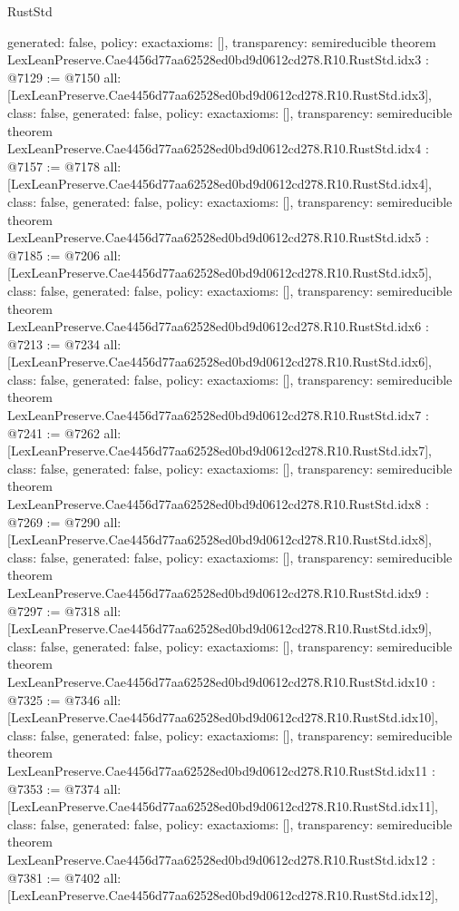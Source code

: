 \begin{lexlean}{RustStd}
\begin{coremodule}
{  generated: false,
  policy: exact{axioms: []},
  transparency: semireducible
}
theorem LexLeanPreserve.Cae4456d77aa62528ed0bd9d0612cd278.R10.RustStd.idx3 : @7129 := @7150 {
  all: [LexLeanPreserve.Cae4456d77aa62528ed0bd9d0612cd278.R10.RustStd.idx3],
  class: false,
  generated: false,
  policy: exact{axioms: []},
  transparency: semireducible
}
theorem LexLeanPreserve.Cae4456d77aa62528ed0bd9d0612cd278.R10.RustStd.idx4 : @7157 := @7178 {
  all: [LexLeanPreserve.Cae4456d77aa62528ed0bd9d0612cd278.R10.RustStd.idx4],
  class: false,
  generated: false,
  policy: exact{axioms: []},
  transparency: semireducible
}
theorem LexLeanPreserve.Cae4456d77aa62528ed0bd9d0612cd278.R10.RustStd.idx5 : @7185 := @7206 {
  all: [LexLeanPreserve.Cae4456d77aa62528ed0bd9d0612cd278.R10.RustStd.idx5],
  class: false,
  generated: false,
  policy: exact{axioms: []},
  transparency: semireducible
}
theorem LexLeanPreserve.Cae4456d77aa62528ed0bd9d0612cd278.R10.RustStd.idx6 : @7213 := @7234 {
  all: [LexLeanPreserve.Cae4456d77aa62528ed0bd9d0612cd278.R10.RustStd.idx6],
  class: false,
  generated: false,
  policy: exact{axioms: []},
  transparency: semireducible
}
theorem LexLeanPreserve.Cae4456d77aa62528ed0bd9d0612cd278.R10.RustStd.idx7 : @7241 := @7262 {
  all: [LexLeanPreserve.Cae4456d77aa62528ed0bd9d0612cd278.R10.RustStd.idx7],
  class: false,
  generated: false,
  policy: exact{axioms: []},
  transparency: semireducible
}
theorem LexLeanPreserve.Cae4456d77aa62528ed0bd9d0612cd278.R10.RustStd.idx8 : @7269 := @7290 {
  all: [LexLeanPreserve.Cae4456d77aa62528ed0bd9d0612cd278.R10.RustStd.idx8],
  class: false,
  generated: false,
  policy: exact{axioms: []},
  transparency: semireducible
}
theorem LexLeanPreserve.Cae4456d77aa62528ed0bd9d0612cd278.R10.RustStd.idx9 : @7297 := @7318 {
  all: [LexLeanPreserve.Cae4456d77aa62528ed0bd9d0612cd278.R10.RustStd.idx9],
  class: false,
  generated: false,
  policy: exact{axioms: []},
  transparency: semireducible
}
theorem LexLeanPreserve.Cae4456d77aa62528ed0bd9d0612cd278.R10.RustStd.idx10 : @7325 := @7346 {
  all: [LexLeanPreserve.Cae4456d77aa62528ed0bd9d0612cd278.R10.RustStd.idx10],
  class: false,
  generated: false,
  policy: exact{axioms: []},
  transparency: semireducible
}
theorem LexLeanPreserve.Cae4456d77aa62528ed0bd9d0612cd278.R10.RustStd.idx11 : @7353 := @7374 {
  all: [LexLeanPreserve.Cae4456d77aa62528ed0bd9d0612cd278.R10.RustStd.idx11],
  class: false,
  generated: false,
  policy: exact{axioms: []},
  transparency: semireducible
}
theorem LexLeanPreserve.Cae4456d77aa62528ed0bd9d0612cd278.R10.RustStd.idx12 : @7381 := @7402 {
  all: [LexLeanPreserve.Cae4456d77aa62528ed0bd9d0612cd278.R10.RustStd.idx12],
}
\end{coremodule}
\end{lexlean}
